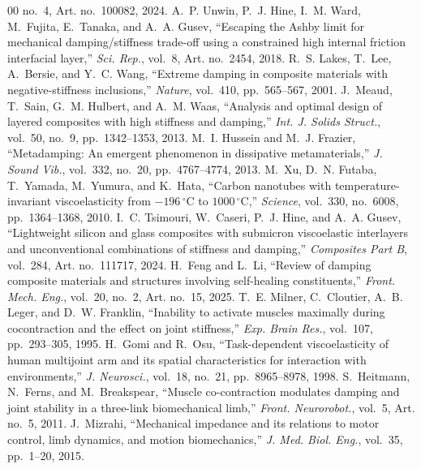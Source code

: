 ﻿\documentclass[conference]{IEEEtran}
\begin{document}
\begin{thebibliography}{00}
no.~4, Art. no.~100082, 2024.
A.~P. Unwin, P.~J. Hine, I.~M. Ward, M.~Fujita, E.~Tanaka, and A.~A. Gusev,
``Escaping the Ashby limit for mechanical damping/stiffness trade-off using
a constrained high internal friction interfacial layer,'' \emph{Sci. Rep.},
vol.~8, Art. no.~2454, 2018.
R.~S. Lakes, T.~Lee, A.~Bersie, and Y.~C. Wang, ``Extreme damping in
composite materials with negative-stiffness inclusions,'' \emph{Nature},
vol.~410, pp.~565--567, 2001.
J.~Meaud, T.~Sain, G.~M. Hulbert, and A.~M. Waas, ``Analysis and optimal
design of layered composites with high stiffness and damping,''
\emph{Int. J. Solids Struct.}, vol.~50, no.~9, pp.~1342--1353, 2013.
M.~I. Hussein and M.~J. Frazier, ``Metadamping: An emergent phenomenon in
dissipative metamaterials,'' \emph{J. Sound Vib.}, vol.~332, no.~20,
pp.~4767--4774, 2013.
M.~Xu, D.~N. Futaba, T.~Yamada, M.~Yumura, and K.~Hata, ``Carbon nanotubes
with temperature-invariant viscoelasticity from $-196\,^{\circ}\mathrm{C}$ to
$1000\,^{\circ}\mathrm{C}$,'' \emph{Science}, vol.~330, no.~6008,
pp.~1364--1368, 2010.
I.~C. Tsimouri, W.~Caseri, P.~J. Hine, and A.~A. Gusev, ``Lightweight silicon
and glass composites with submicron viscoelastic interlayers and
unconventional combinations of stiffness and damping,'' \emph{Composites
Part B}, vol.~284, Art. no.~111717, 2024.
H.~Feng and L.~Li, ``Review of damping composite materials and structures
involving self-healing constituents,'' \emph{Front. Mech. Eng.}, vol.~20,
no.~2, Art. no.~15, 2025.
T.~E. Milner, C.~Cloutier, A.~B. Leger, and D.~W. Franklin, ``Inability to
activate muscles maximally during cocontraction and the effect on joint
stiffness,'' \emph{Exp. Brain Res.}, vol.~107, pp.~293--305, 1995.
H.~Gomi and R.~Osu, ``Task-dependent viscoelasticity of human multijoint arm
and its spatial characteristics for interaction with environments,''
\emph{J. Neurosci.}, vol.~18, no.~21, pp.~8965--8978, 1998.
S.~Heitmann, N.~Ferns, and M.~Breakspear, ``Muscle co-contraction modulates
damping and joint stability in a three-link biomechanical limb,''
\emph{Front. Neurorobot.}, vol.~5, Art. no.~5, 2011.
J.~Mizrahi, ``Mechanical impedance and its relations to motor control, limb
dynamics, and motion biomechanics,'' \emph{J. Med. Biol. Eng.}, vol.~35,
pp.~1--20, 2015.

\end{thebibliography}
\end{document}
